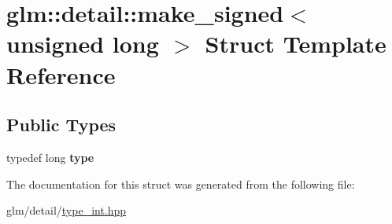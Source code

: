 \hypertarget{structglm_1_1detail_1_1make__signed_3_01unsigned_01long_01_4}{\section{glm\-:\-:detail\-:\-:make\-\_\-signed$<$ unsigned long $>$ Struct Template Reference}
\label{structglm_1_1detail_1_1make__signed_3_01unsigned_01long_01_4}
}
\subsection*{Public Types}
\begin{DoxyCompactItemize}
\item 
\hypertarget{structglm_1_1detail_1_1make__signed_3_01unsigned_01long_01_4_a055abdf7ba75d133a9784c2749f2336f}{typedef long {\bfseries type}}\label{structglm_1_1detail_1_1make__signed_3_01unsigned_01long_01_4_a055abdf7ba75d133a9784c2749f2336f}

\end{DoxyCompactItemize}


The documentation for this struct was generated from the following file\-:\begin{DoxyCompactItemize}
\item 
glm/detail/\hyperlink{type__int_8hpp}{type\-\_\-int.\-hpp}\end{DoxyCompactItemize}
